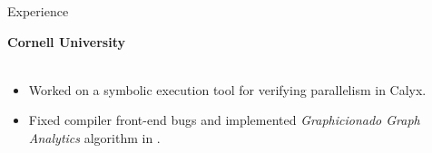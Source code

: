 \begin{rSection}{Experience}
	{\textbf{\large{Cornell University}} \hfill \color{darkgray}{10/2021 - 12/2022} 
	\\ \vspace*{1mm}
	 \hfill \color{darkgray}{Ithaca, NY}
	\\
	\color{black}
	\begin{minipage}{40em}
		\begin{itemize}
			\item Worked on a symbolic execution tool for verifying parallelism in Calyx.
			\item Fixed compiler front-end bugs and implemented \textit{Graphicionado Graph Analytics} algorithm in \href{https://docs.calyxir.org/contributors.html}{}.
		\end{itemize}
	\end{minipage}} 

\end{rSection} 
